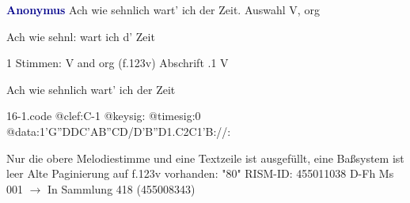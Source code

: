 \documentclass[twocolumn]{book}
\begin{document}
\newline \par \vspace{7pt} \textcolor{darkblue}{\textbf{Anonymus  }}
\newline Ach wie sehnlich wart' ich der Zeit. Auswahl
\newline V, org
\newline \begin{itshape}[f.123v, heading:] Ach wie sehnl: wart ich d' Zeit\end{itshape} 
\newline \textcolor{darkblue}{}  1 Stimmen: V and org  (f.123v)
\newline Abschrift
.1  V
\newline \begin{footnotesize} Ach wie sehnlich wart' ich der Zeit \end{footnotesize}  
\begin{filecontents*}{16-1.code}
@clef:C-1
@keysig:
@timesig:0
@data:1'G''DDC'AB''CD/D'B''D1.C2C1'B://:
\end{filecontents*}
\newline
%
\newline Nur die obere Melodiestimme und eine Textzeile ist ausgefüllt, eine Baßsystem ist leer
\newline Alte Paginierung auf f.123v vorhanden: "80"
\newline RISM-ID: 455011038
\newline D-Fh  Ms 001
\newline $\rightarrow$ In Sammlung 418 (455008343)
      
\end{document}

